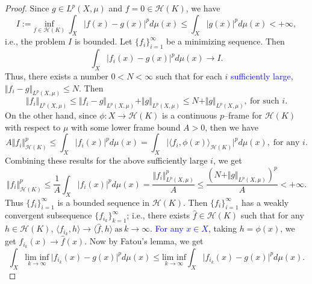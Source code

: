 \documentclass{amsart}
\numberwithin{equation}{section}
\theoremstyle{plain}
\theoremstyle{remark}
\theoremstyle{definition}
\begin{document}
\begin{proof}
Since $g \in L^p(X,\mu)$ and $f=0 \in \mathscr{H}(K)$, we have 
 \begin{equation*}
   I:= \underset{f \in \mathscr{H}(K)}{\text{inf}} \ \int_{X} \vert f(x) - g(x) \vert ^p d\mu(x) \leq \int_{X} \vert g(x) \vert ^p d\mu(x)  < + \infty ,
\end{equation*}
i.e., the problem $I$ is bounded.
Let $\{f_i\}_{i=1}^{\infty}$ be a minimizing sequence. Then
\begin{equation*}
    \int_{X} \vert f_i(x) - g(x) \vert ^p d\mu(x) \rightarrow I.
\end{equation*}
Thus, there exists a number $0<N< \infty$ such that for each $i$ \textcolor{blue}{sufficiently large}, $ \Vert f_i - g \Vert_{L^p(X,\mu)} \leq  N$.
Then
\begin{equation*}
    \Vert f_i \Vert_{L^p(X,\mu)} \leq \Vert f_i - g \Vert_{L^p(X,\mu)} + \Vert g \Vert_{L^p(X,\mu)} \leq  N + \Vert g \Vert_{L^p(X,\mu)}, \ \text{for such $i$}.
\end{equation*}
On the other hand, since $\phi: X \rightarrow \mathscr{H}(K)$ is a continuous $p$--frame for $\mathscr{H}(K)$ with respect to $\mu$ with some lower frame bound $A>0$, then we have
\begin{equation*}
    A \Vert f_i \Vert_{\mathscr{H}(K)}^p \leq \int_{X} \vert f_i(x) \vert ^p d\mu(x) = \int_{X} \vert \langle f_i, \phi(x) \rangle_{\mathscr{H}(K)} \vert ^p d\mu(x), \;\text{for any $i$.}
\end{equation*}
Combining these results for the above sufficiently large $i$, we get
\begin{equation*}
     \Vert f_i \Vert_{\mathscr{H}(K)}^p \leq \frac{1}{A} \int_{X} \vert f_i(x) \vert ^p d\mu(x)  =  \frac{ \Vert f_i \Vert_{L^p(X,\mu)}^p}{A} \leq \frac{(N + \Vert g \Vert_{L^p(X,\mu)})^p}{A} < + \infty.
\end{equation*}
Thus  $\{f_i\}_{i=1}^{\infty}$ is a bounded sequence in $\mathscr{H}(K)$. Then $\{f_i\}_{i=1}^{\infty}$ has a weakly convergent subsequence $\{f_{i_k}\}_{k=1}^{\infty}$; i.e., there exists  $\hat{f} \in \mathscr{H}(K)$ such that for any $h \in \mathscr{H}(K)$, $  \langle f_{i_k}, h \rangle \rightarrow \langle \hat{f}, h \rangle \ \text{as} \ k \rightarrow \infty.$
\textcolor{blue}{For any $x \in X$}, taking $h = \phi(x)$, we get $f_{i_k}(x) \rightarrow \hat{f}(x)$.
Now by Fatou's lemma, we get 
\begin{equation*}
     \int_{X}  \underset{k \rightarrow \infty}{\text{lim inf}} \ \vert f_{i_k}(x) - g(x) \vert ^p d\mu(x) \leq  \underset{k \rightarrow \infty}{\text{lim inf}} \int_{X}  \vert f_{i_k}(x) - g(x) \vert ^p d\mu(x).

\end{equation*}
\end{proof}
\end{document}
